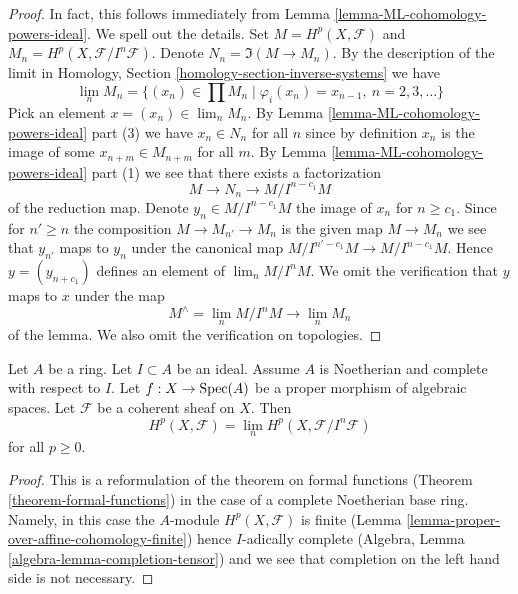 \begin{proof}
In fact, this follows immediately from
Lemma \ref{lemma-ML-cohomology-powers-ideal}. We spell out the details.
Set $M = H^p(X, \mathcal{F})$ and $M_n = H^p(X, \mathcal{F}/I^n\mathcal{F})$.
Denote $N_n = \Im(M \to M_n)$.
By the description of the limit in Homology, Section
\ref{homology-section-inverse-systems} we have
$$
\lim_n M_n
=
\{(x_n) \in \prod M_n \mid \varphi_i(x_n) = x_{n - 1}, \ n = 2, 3, \ldots\}
$$
Pick an element $x = (x_n) \in \lim_n M_n$.
By Lemma \ref{lemma-ML-cohomology-powers-ideal} part (3)
we have $x_n \in N_n$ for all $n$ since by
definition $x_n$ is the image of some $x_{n + m} \in M_{n + m}$ for
all $m$. By Lemma \ref{lemma-ML-cohomology-powers-ideal} part (1)
we see that there exists a factorization
$$
M \to N_n \to M/I^{n - c_1}M
$$
of the reduction map. Denote $y_n \in M/I^{n - c_1}M$ the image of $x_n$
for $n \geq c_1$. Since for $n' \geq n$ the composition
$M \to M_{n'} \to M_n$ is the given map $M \to M_n$ we see that
$y_{n'}$ maps to $y_n$ under the canonical map
$M/I^{n' - c_1}M \to M/I^{n - c_1}M$. Hence $y = (y_{n + c_1})$
defines an element of $\lim_n M/I^nM$.
We omit the verification that $y$ maps to $x$ under the
map
$$
M^\wedge = \lim_n M/I^nM \longrightarrow \lim_n M_n
$$
of the lemma. We also omit the verification on topologies.
\end{proof}

\begin{lemma}
\label{lemma-spell-out-theorem-formal-functions}
Let $A$ be a ring. Let $I \subset A$ be an ideal. Assume $A$ is
Noetherian and complete with respect to $I$.
Let $f : X \to \mathop{\mathrm{Spec}}(A)$ be a proper morphism of algebraic spaces.
Let $\mathcal{F}$ be a coherent sheaf on $X$. Then
$$
H^p(X, \mathcal{F}) = \lim_n H^p(X, \mathcal{F}/I^n\mathcal{F})
$$
for all $p \geq 0$.
\end{lemma}

\begin{proof}
This is a reformulation of the theorem on formal functions
(Theorem \ref{theorem-formal-functions}) in the
case of a complete Noetherian base ring. Namely, in this case the
$A$-module $H^p(X, \mathcal{F})$ is finite
(Lemma \ref{lemma-proper-over-affine-cohomology-finite}) hence
$I$-adically complete (Algebra, Lemma \ref{algebra-lemma-completion-tensor})
and we see that completion on the left hand side is not necessary.
\end{proof}

